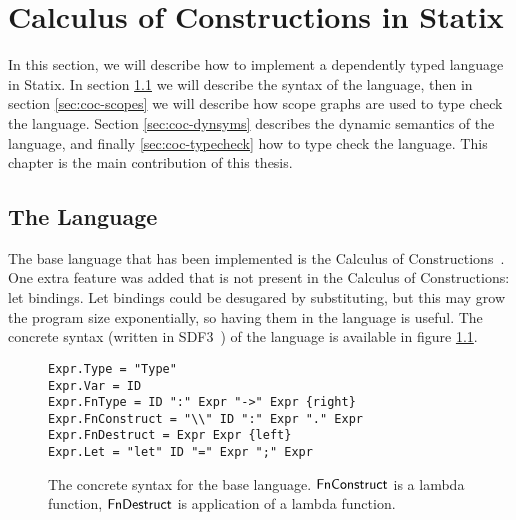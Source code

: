\chapter{Calculus of Constructions in Statix}
\label{chap:baselang}

In this section, we will describe how to implement a dependently typed language in Statix. In section \ref{sec:coc-syntax} we will describe the syntax of the language, then in section \ref{sec:coc-scopes} we will describe how scope graphs are used to type check the language. Section \ref{sec:coc-dynsyms} describes the dynamic semantics of the language, and finally \ref{sec:coc-typecheck} how to type check the language. This chapter is the main contribution of this thesis.

\section{The Language}
\label{sec:coc-syntax}

The base language that has been implemented is the Calculus of Constructions~\cite{Coquand_Huet_1988}. One extra feature was added that is not present in the Calculus of Constructions: let bindings. Let bindings could be desugared by substituting, but this may grow the program size exponentially, so having them in the language is useful. The concrete syntax (written in SDF3~\cite{sdf3}) of the language is available in figure \ref{fig:syntax}.

\begin{figure}[h]
\begin{lstlisting}
Expr.Type = "Type"
Expr.Var = ID
Expr.FnType = ID ":" Expr "->" Expr {right}
Expr.FnConstruct = "\\" ID ":" Expr "." Expr
Expr.FnDestruct = Expr Expr {left}
Expr.Let = "let" ID "=" Expr ";" Expr
\end{lstlisting}
\caption{The concrete syntax for the base language. $\mathsf{FnConstruct}$ is a lambda function, $\mathsf{FnDestruct}$ is application of a lambda function.}
\label{fig:syntax}
\end{figure}


